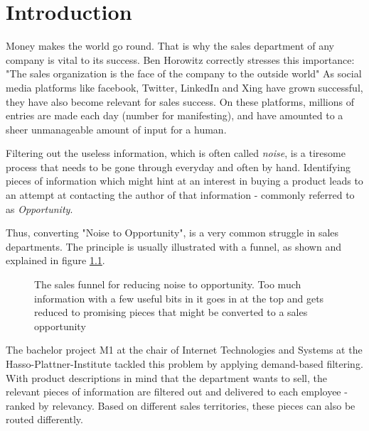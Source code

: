 \chapter{Introduction}\label{ch:introduction}
Money makes the world go round. That is why the sales department
of any company is vital to its success. Ben Horowitz correctly
stresses this importance: "The sales organization is the face of the company to the outside world" \cite{bh:2014}
As social media platforms like facebook, Twitter, LinkedIn and Xing
have grown successful, they have also become relevant for
sales success. On these platforms, millions of entries are made each day (number for manifesting),
and have amounted to a sheer unmanageable amount of input for a human.
\newline

Filtering out the useless information, which is often called \textit{noise},
is a tiresome process that needs to be gone through everyday and
often by hand.
Identifying pieces of information which might hint at an
interest in buying a product
leads to an attempt at contacting the author of that information - commonly
referred to as \textit{Opportunity}.
\newline

Thus, converting "Noise to Opportunity", is a very common struggle
in sales departments. The principle is usually illustrated with a funnel,
as shown and explained in figure \ref{fig:sales-funnel}.


\begin{figure}[bth]
    \caption{The sales funnel for reducing noise to opportunity. Too much
    information with a few useful bits in it goes in at the top and gets
    reduced to promising pieces that might be converted to a sales opportunity}
    \label{fig:sales-funnel}
\end{figure}

The bachelor project M1 at the chair of Internet Technologies and Systems
at the Hasso-Plattner-Institute tackled this problem by applying demand-based filtering.
With product descriptions in mind that the department wants to sell,
the relevant pieces of information are filtered out and delivered to each employee -
ranked by relevancy. Based on different sales territories,
these pieces can also be routed differently.
\newline


